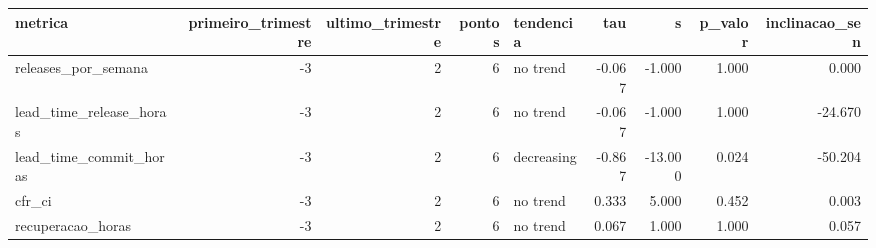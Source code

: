 \begin{tabular}{lrrrlrrrr}
\toprule
metrica & primeiro_trimestre & ultimo_trimestre & pontos & tendencia & tau & s & p_valor & inclinacao_sen \\
\midrule
releases_por_semana & -3 & 2 & 6 & no trend & -0.067 & -1.000 & 1.000 & 0.000 \\
lead_time_release_horas & -3 & 2 & 6 & no trend & -0.067 & -1.000 & 1.000 & -24.670 \\
lead_time_commit_horas & -3 & 2 & 6 & decreasing & -0.867 & -13.000 & 0.024 & -50.204 \\
cfr_ci & -3 & 2 & 6 & no trend & 0.333 & 5.000 & 0.452 & 0.003 \\
recuperacao_horas & -3 & 2 & 6 & no trend & 0.067 & 1.000 & 1.000 & 0.057 \\
\bottomrule
\end{tabular}
